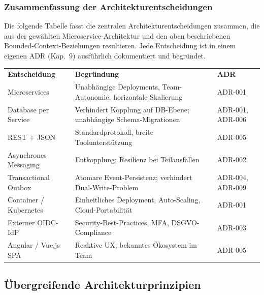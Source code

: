 \subsubsection{Zusammenfassung der Architekturentscheidungen}

Die folgende Tabelle fasst die zentralen Architekturentscheidungen
zusammen, die aus der gewählten Microservice-Architektur und den
oben beschriebenen Bounded-Context-Beziehungen resultieren. Jede
Entscheidung ist in einem eigenen ADR (Kap.~9) ausführlich
dokumentiert und begründet.

\begin{tabularx}{\textwidth}{L{3.5cm} X L{2cm}}
  \color{white}\textbf{Entscheidung} &
  \color{white}\textbf{Begründung} &
  \color{white}\textbf{ADR} \\

  Microservices &
  Unabhängige Deployments, Team-Autonomie,
  horizontale Skalierung &
  ADR-001 \\

  Database per Service &
  Verhindert Kopplung auf DB-Ebene; unabhängige
  Schema-Migrationen &
  ADR-001, ADR-006 \\

  REST + JSON &
  Standardprotokoll, breite Toolunterstützung &
  ADR-005 \\

  Asynchrones Messaging &
  Entkopplung; Resilienz bei Teilausfällen &
  ADR-002 \\

  Transactional Outbox &
  Atomare Event-Persistenz; verhindert
  Dual-Write-Problem &
  ADR-004, ADR-009 \\

  Container / Kubernetes &
  Einheitliches Deployment, Auto-Scaling,
  Cloud-Portabilität &
  ADR-001 \\

  Externer OIDC-IdP &
  Security-Best-Practices, MFA,
  DSGVO-Compliance &
  ADR-003 \\

  Angular / Vue.js SPA &
  Reaktive UX; bekanntes Ökosystem im Team &
  ADR-005 \\
\end{tabularx}


\subsection{Übergreifende Architekturprinzipien}

